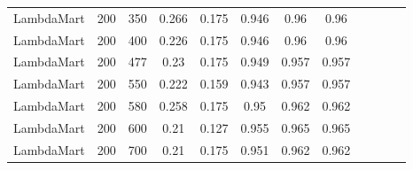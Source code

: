 \begin{longtable}{*{12}{c}}
LambdaMart & 200 & 350 & 0.266 & 0.175 & 0.946 & 0.96 & 0.96 \\ 
LambdaMart & 200 & 400 & 0.226 & 0.175 & 0.946 & 0.96 & 0.96 \\ 
LambdaMart & 200 & 477 & 0.23 & 0.175 & 0.949 & 0.957 & 0.957 \\ 
LambdaMart & 200 & 550 & 0.222 & 0.159 & 0.943 & 0.957 & 0.957 \\ 
LambdaMart & 200 & 580 & 0.258 & 0.175 & 0.95 & 0.962 & 0.962 \\ 
LambdaMart & 200 & 600 & 0.21 & 0.127 & 0.955 & 0.965 & 0.965 \\ 
LambdaMart & 200 & 700 & 0.21 & 0.175 & 0.951 & 0.962 & 0.962 \\ 
\end{longtable}